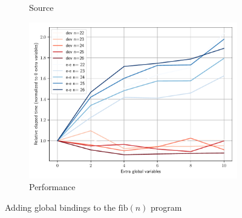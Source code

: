 \documentclass{beamer}
\begin{document}
\begin{frame}[allowframebreaks]
  \begin{figure}
    \begin{subfigure}[b]{0.45\textwidth}
      \centering
      \tiny
      \caption{Source}
      \label{fig:perf-fib-more-bindings}
    \end{subfigure}
    \qquad
    \begin{subfigure}[b]{0.45\textwidth}
      \includegraphics[width=\textwidth]{thesis/img/perf_fib_more_vars.pdf}
      \caption{Performance}
      \label{fig:perf-fib-more-vars-graph}
    \end{subfigure}
    \caption{Adding global bindings to the $\text{fib}(n)$ program}
  \end{figure}


\end{frame}
\end{document}
